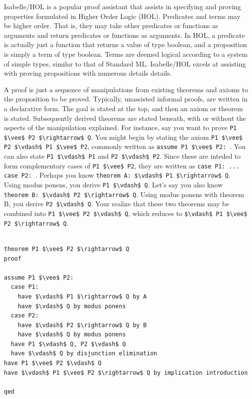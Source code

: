 \documentclass[letterpaper, 11pt]{extarticle}
\begin{document}
Isabelle/HOL is a popular proof assistant that assists in specifying and proving properties
formulated in Higher Order Logic (HOL).  Predicates and terms may be higher order. That is, they
may take other predicates or functions as arguments and return predicates or functions as arguments. 
In HOL, a predicate is actually just a function that returns a value of type boolean, and a proposition
is simply a term of type boolean. Terms are deemed logical according to a system of simple types, similar to
that of Standard ML.  Isabelle/HOL excels at assisting with proving propositions with numerous details details. 

A proof is just a sequence of manipulations from existing theorems and axioms to the proposition to be proved.  
Typically, unassisted informal proofs, are written in a declarative form. The goal is stated at the top,
and then an axiom or theorem is stated. Subsequently derived theorems are stated beneath, with
or without the aspects of the manipulation explained.
For instance, say you want to prove \lstinline[mathescape]{P1 $\vee$ P2 $\rightarrow$ Q}.  You might begin by 
stating the axiom \lstinline[mathescape]{P1 $\vee$ P2 $\vdash$ P1 $\vee$ P2}, commonly written as \lstinline[language=logic]{assume P1 $\vee$ P2: }.
You can also state \lstinline[mathescape]{P1 $\vdash$ P1} and \lstinline[mathescape]{P2 $\vdash$ P2}. Since
these are inteded to form complementary cases of \lstinline[mathescape]{P1 $\vee$ P2}, they are written as \lstinline[language=logic]{case P1: ... case P2: }.
Perhaps you know \lstinline[language=logic]{theorem A: $\vdash$ P1 $\rightarrow$ Q}. Using modus ponens, you derive \lstinline[mathescape]{P1 $\vdash$ Q}. Let's say
you also know \lstinline[language=logic]{theorem B: $\vdash$ P2 $\rightarrow$ Q}. Using modus ponens with theorem B, you derive \lstinline[mathescape]{P2 $\vdash$ Q}.
Your realize that these two theorems may be combined into \lstinline[mathescape]{P1 $\vee$ P2 $\vdash$ Q}, which reduces to \lstinline[mathescape]{$\vdash$ P1 $\vee$ P2 $\rightarrow$ Q}.


\begin{lstlisting}[language=logic, mathescape]

theorem P1 $\vee$ P2 $\rightarrow$ Q
proof

assume P1 $\vee$ P2:
  case P1:
    have $\vdash$ P1 $\rightarrow$ Q by A
    have $\vdash$ Q by modus ponens
  case P2:
    have $\vdash$ P2 $\rightarrow$ Q by B    
    have $\vdash$ Q by modus ponens
  have P1 $\vdash$ Q, P2 $\vdash$ Q
  have $\vdash$ Q by disjunction elimination
have P1 $\vee$ P2 $\vdash$ Q
have $\vdash$ P1 $\vee$ P2 $\rightarrow$ Q by implication introduction  

qed
  
\end{lstlisting}
\end{document}
